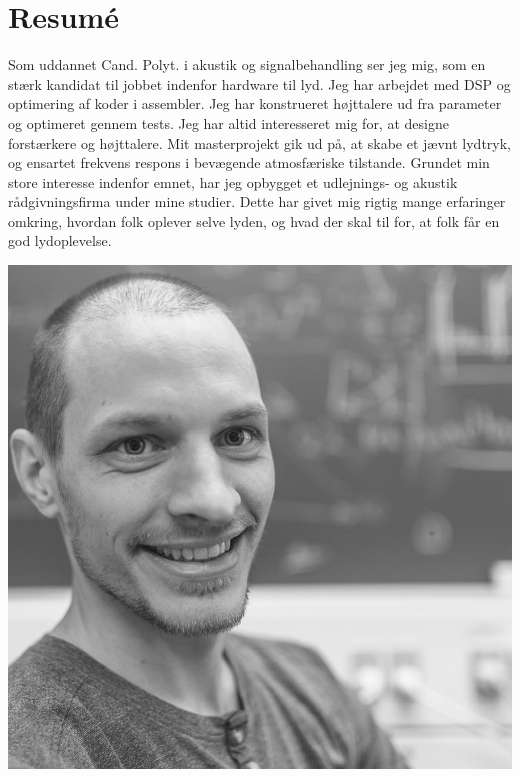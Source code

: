 \documentclass{my_cv}
\begin{document}
%
\noindent

    \vspace*{4pt}
    \vspace{10pt}
	\begin{minipage}[t]{.69\textwidth}%
    \section{Resumé}
    Som uddannet Cand. Polyt. i akustik og signalbehandling ser jeg mig, som en stærk kandidat til jobbet indenfor hardware til lyd. Jeg har arbejdet med DSP og optimering af koder i assembler. Jeg har konstrueret højttalere ud fra parameter og optimeret gennem tests. Jeg har altid interesseret mig for, at designe forstærkere og højttalere. Mit masterprojekt gik ud på, at skabe et jævnt lydtryk, og ensartet frekvens respons i bevægende atmosfæriske tilstande. Grundet min store interesse indenfor emnet, har jeg opbygget et udlejnings- og akustik rådgivningsfirma under mine studier. Dette har givet mig rigtig mange erfaringer omkring, hvordan folk oplever selve lyden, og hvad der skal til for, at folk får en god lydoplevelse.

\end{minipage}
\hfill%
\begin{minipage}[t][0.3\textwidth][b]{.29\textwidth}
	\includegraphics[width=\textwidth]{figures/mig.jpg}
\end{minipage}%
%
\end{document}
